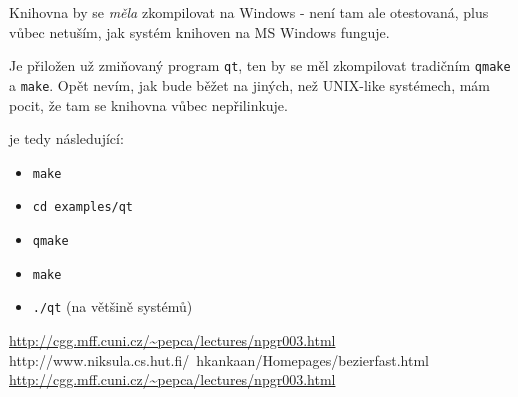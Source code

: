 \documentclass[11pt]{article} %
\begin{document}
Knihovna by se \emph{měla} zkompilovat na Windows - není tam ale otestovaná, plus vůbec netuším, jak systém knihoven na MS Windows funguje.

Je přiložen už zmiňovaný program \texttt{qt}, ten by se měl zkompilovat tradičním \texttt{qmake} a \texttt{make}. Opět nevím, jak bude běžet na jiných, než UNIX-like systémech, mám pocit, že tam se knihovna vůbec nepřilinkuje.

 je tedy následující:
\begin{itemize}
    \item \texttt{make}
    \item \texttt{cd examples/qt}
    \item \texttt{qmake}
    \item \texttt{make}
    \item \texttt{./qt} (na většině systémů)
\end{itemize}

\begin{thebibliography}{9}

     \url{http://cgg.mff.cuni.cz/~pepca/lectures/npgr003.html}
       http://www.niksula.cs.hut.fi/~hkankaan/Homepages/bezierfast.html
       \url{http://cgg.mff.cuni.cz/~pepca/lectures/npgr003.html}
     
 \end{thebibliography}
\end{document}
